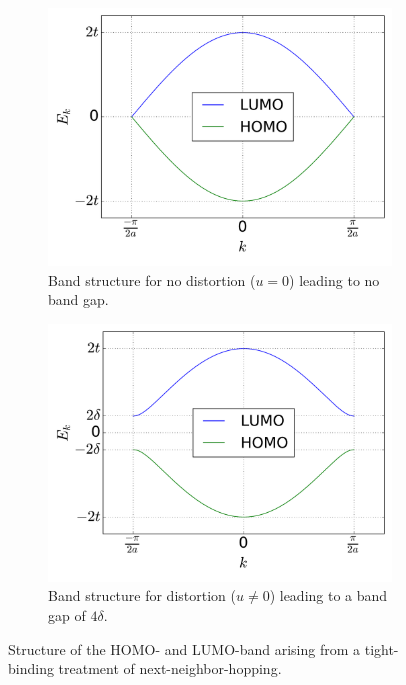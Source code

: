 \begin{figure}
	\centering
	\begin{subfigure}{0.49\textwidth}
		\includegraphics[width =\textwidth]{Images/Plots/bandstructure_without_gap}
		\caption{Band structure for no distortion ($u = 0$) leading to no band gap.}
		\label{image_bs_wo_gap}
	\end{subfigure}\hspace*{0.2cm}
	\begin{subfigure}{0.49\textwidth}
		\includegraphics[width = \textwidth]{Images/Plots/bandstructure_with_gap}
		\caption{Band structure for distortion ($u \neq 0$) leading to a band gap of $4\delta$.}
		\label{image_bs_w_gap}
	\end{subfigure}
	\caption{Structure of the HOMO- and LUMO-band arising from a tight-binding treatment of next-neighbor-hopping.}
	\label{images_bs}
\end{figure}
